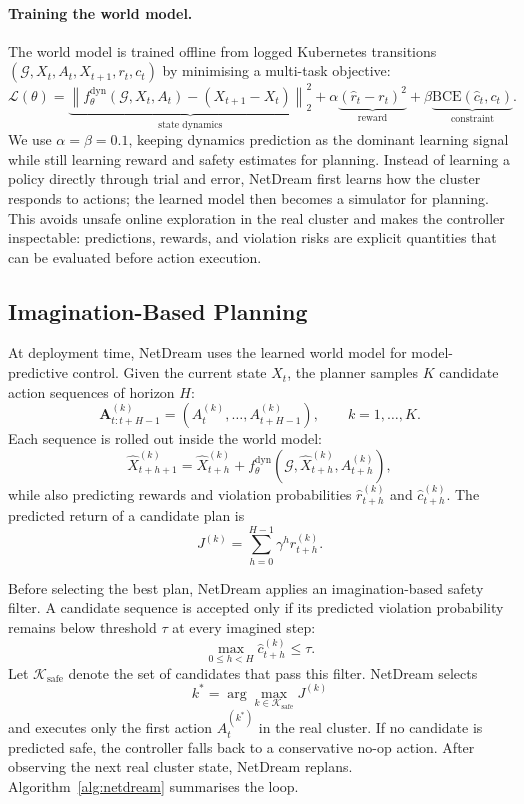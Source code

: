 \paragraph{Training the world model.}
The world model is trained offline from logged Kubernetes transitions
$(\mathcal{G},X_t,A_t,X_{t+1},r_t,c_t)$ by minimising a multi-task
objective:
\[
\mathcal{L}(\theta)
=
\underbrace{
\left\|
f_{\theta}^{\mathrm{dyn}}(\mathcal{G},X_t,A_t)
-
(X_{t+1}-X_t)
\right\|_2^2
}_{\text{state dynamics}}
+
\alpha
\underbrace{
(\hat{r}_t-r_t)^2
}_{\text{reward}}
+
\beta
\underbrace{
\mathrm{BCE}(\hat{c}_t,c_t)
}_{\text{constraint}} .
\]
We use $\alpha=\beta=0.1$, keeping dynamics prediction as the dominant
learning signal while still learning reward and safety estimates for
planning. Instead of learning a policy directly through trial and error,
NetDream first learns how the cluster responds to actions; the learned
model then becomes a simulator for planning. This avoids unsafe online
exploration in the real cluster and makes the controller inspectable:
predictions, rewards, and violation risks are explicit quantities that
can be evaluated before action execution.

\subsection{Imagination-Based Planning}
\label{sec:planning}

At deployment time, NetDream uses the learned world model for
model-predictive control. Given the current state $X_t$, the planner
samples $K$ candidate action sequences of horizon $H$:
\[
\mathbf{A}^{(k)}_{t:t+H-1}
=
(A^{(k)}_t,\ldots,A^{(k)}_{t+H-1}),
\qquad k=1,\ldots,K .
\]
Each sequence is rolled out inside the world model:
\[
\hat{X}^{(k)}_{t+h+1}
=
\hat{X}^{(k)}_{t+h}
+
f_{\theta}^{\mathrm{dyn}}
(\mathcal{G},\hat{X}^{(k)}_{t+h},A^{(k)}_{t+h}),
\]
while also predicting rewards and violation probabilities
$\hat{r}^{(k)}_{t+h}$ and $\hat{c}^{(k)}_{t+h}$. The predicted return of
a candidate plan is
\[
J^{(k)}
=
\sum_{h=0}^{H-1}
\gamma^h \hat{r}^{(k)}_{t+h}.
\]

Before selecting the best plan, NetDream applies an imagination-based
safety filter. A candidate sequence is accepted only if its predicted
violation probability remains below threshold $\tau$ at every imagined
step:
\[
\max_{0\le h < H}\hat{c}^{(k)}_{t+h}\le \tau .
\]
Let $\mathcal{K}_{\mathrm{safe}}$ denote the set of candidates that pass
this filter. NetDream selects
\[
k^*=\arg\max_{k\in\mathcal{K}_{\mathrm{safe}}} J^{(k)}
\]
and executes only the first action $A^{(k^*)}_t$ in the real cluster. If
no candidate is predicted safe, the controller falls back to a
conservative no-op action. After observing the next real cluster state,
NetDream replans. Algorithm~\ref{alg:netdream} summarises the loop.

